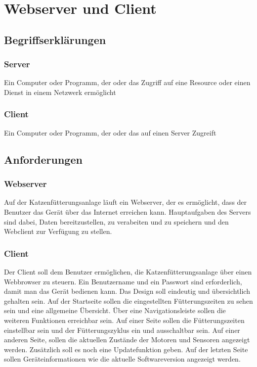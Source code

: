 \chapter{Webserver und Client}

\section{Begriffserklärungen}

\subsection{Server}
Ein Computer oder Programm, der oder das Zugriff auf eine Resource oder einen Dienst in einem Netzwerk ermöglicht

\subsection{Client}
Ein Computer oder Programm, der oder das auf einen Server Zugreift

\section{Anforderungen}

\subsection{Webserver}
Auf der Katzenfütterungsanlage läuft ein Webserver, der es ermöglicht, dass der Benutzer das Gerät über das Internet erreichen kann. Hauptaufgaben des Servers sind dabei, Daten bereitzustellen, zu verabeiten und zu speichern und den Webclient zur Verfügung zu stellen.

\subsection{Client}
Der Client soll dem Benutzer ermöglichen, die Katzenfütterungsanlage über einen Webbrowser zu steuern. Ein Benutzername und ein Passwort sind erforderlich, damit man das Gerät bedienen kann. Das Design soll eindeutig und übersichtlich gehalten sein. Auf der Startseite sollen die eingestellten Fütterungszeiten zu sehen sein und eine allgemeine Übersicht. Über eine Navigationsleiste sollen die weiteren Funktionen erreichbar sein. Auf einer Seite sollen die Fütterungszeiten einstellbar sein und der Fütterungszyklus ein und ausschaltbar sein. Auf einer anderen Seite, sollen die aktuellen Zustände der Motoren und Sensoren angezeigt werden. Zusätzlich soll es noch eine Updatefunktion geben. Auf der letzten Seite sollen Geräteinformationen wie die aktuelle Softwareversion angezeigt werden.

